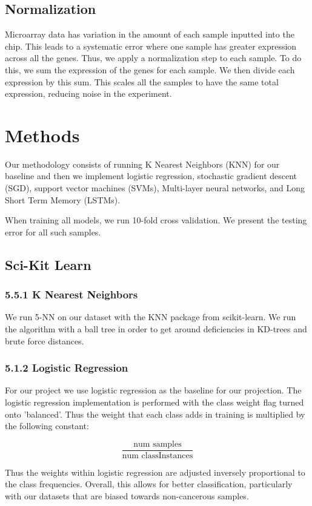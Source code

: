 \documentclass[12pt]{scrartcl}
\begin{document}
    \subsection{Normalization}
Microarray data has variation in the amount of each sample inputted into the chip. This leads to a systematic error where one sample has greater expression across all the genes. Thus, we apply a normalization step to each sample. To do this, we sum the expression of the genes for each sample. We then divide each expression by this sum. This scales all the samples to have the same total expression, reducing  noise in the experiment.
    \section{Methods}
    Our methodology consists of running K Nearest Neighbors (KNN) for our baseline and then we implement logistic regression, stochastic gradient descent (SGD), support vector machines (SVMs), Multi-layer neural networks, and Long Short Term Memory (LSTMs).
    
    When training all models, we run 10-fold cross validation. We present the testing error for all such samples. 

    \subsection{Sci-Kit Learn}
    \subsubsection*{5.5.1 K Nearest Neighbors}
    We run 5-NN on our dataset with the KNN package from scikit-learn. We run the algorithm with a ball tree in order to get around deficiencies in KD-trees and brute force distances. 
    
    \subsubsection*{5.1.2 Logistic Regression}
    For our project we use logistic regression as the baseline for our projection. The logistic regression implementation is performed with the class weight flag turned onto 'balanced'. Thus the weight that each class adds in training is multiplied by the following constant:
    
    $$\frac{\textrm{num samples}}{\textrm{num classInstances}}$$
    
    Thus the weights within logistic regression are adjusted inversely proportional to the class frequencies. Overall, this allows for better classification, particularly with our datasets that are biased towards non-cancerous samples. 
\end{document}
